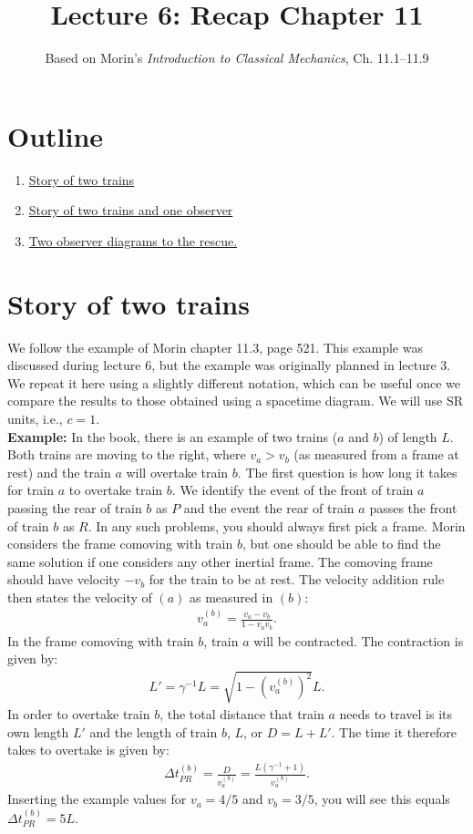 \documentclass[12pt]{article}
\title{\textbf{Lecture 6: Recap Chapter 11}}
\author{Based on Morin's \textit{Introduction to Classical Mechanics}, Ch. 11.1--11.9}
\date{}
\newcommand{\be}{\begin{eqnarray}}
\newcommand{\ee}{\end{eqnarray}}
\begin{document}
\maketitle

\section*{Outline}
\begin{enumerate}
    \item \href{sec:train1}{Story of two trains}
    \item \href{sec:train2}{Story of two trains and one observer}
    \item \href{sec:diagrams}{Two observer diagrams to the rescue.}
\end{enumerate}

\section{Story of two trains}\label{sec:train1}
We follow the example of Morin chapter 11.3, page 521. This example was discussed during lecture 6, but the example was originally planned in lecture 3. We repeat it here using a slightly different notation, which can be useful once we compare the results to those obtained using a spacetime diagram. We will use SR units, i.e., $c = 1$.\\

\noindent
{\bf Example:} In the book, there is an example of two trains ($a$ and $b$) of length $L$. Both trains are moving to the right, where $v_a > v_b$ (as measured from a frame at rest) and the train $a$ will overtake train $b$. The first question is how long it takes for train $a$ to overtake train $b$. We identify the event of the front of train $a$ passing the rear of train $b$ as $P$ and the event the rear of train $a$ passes the front of train $b$ as $R$. In any such problems, you should always first pick a frame. Morin considers the frame comoving with train $b$, but one should be able to find the same solution if one considers any other inertial frame. The comoving frame should have velocity $-v_b$ for the train to be at rest. The velocity addition rule then states the velocity of $(a)$ as measured in $(b)$:
\be
v_a^{(b)} = \frac{v_a - v_b}{1-v_a v_b}. 
\ee
In the frame comoving with train $b$, train $a$ will be contracted. The contraction is given by:
\be
L' = \gamma^{-1} L = \sqrt{{1-(v_a^{(b)})^2}}L.
\ee
In order to overtake train $b$, the total distance that train $a$ needs to travel is its own length $L'$ and the length of train $b$, $L$, or $D = L + L'$. The time it therefore takes to overtake is given by:
\be
\Delta t^{(b)}_{PR} = \frac{D}{v_a^{(b)}} = \frac{L(\gamma^{-1}+1)}{v_a^{(b)}}. 
\ee
Inserting the example values for $v_a = 4/5$ and $v_b = 3/5$, you will see this equals $\Delta t^{(b)}_{PR} = 5L$. \\
\end{document}
